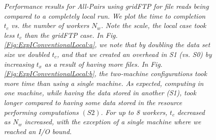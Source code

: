 \documentclass{rspublic}
\begin{document}
\begin{figure}[!ht]
\begin{center}
\caption{\textit{Performance results for All-Pairs using gridFTP for
file reads being compared to a completely local run. We plot the time to
completion $t_c$ vs. the number of workers $N_w$. Note the scale, the
local case took less $t_c$  than the gridFTP case. In Fig.
\ref{Fig:ExpIConventionalLocal:a}, we note that by doubling the data set
size we doubled $t_c$, and that we created an overhead in S1 (vs. S0) by
increasing $t_x$ as a result of having more files.  In Fig.
\ref{Fig:ExpIConventionalLocal:b}, the two-machine configurations took
more time than using a single machine. As expected, computing in one
machine, while having the data stored in another (S1), took longer
compared to having some data stored in the resource performing
computations $(S2)$. For up to 8 workers, $t_c$ decreased as $N_w$
increased, with the exception of a single machine where we reached an
I/O bound.}}
\label{Fig:ExpIConventionalLocal}
\end{center}
\end{figure}
\end{document}

